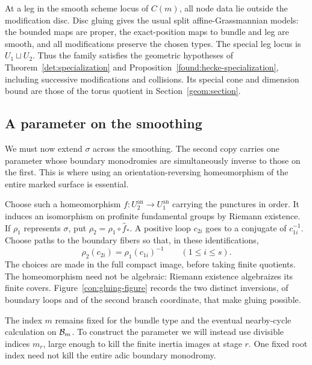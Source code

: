 At a leg in the smooth scheme locus of $C(m)$, all node data lie
outside the modification disc.  Disc gluing gives the usual split
affine-Grassmannian models: the bounded maps are proper, the
exact-position maps to bundle and leg are smooth, and all
modifications preserve the chosen types.  The special leg locus is
$U_1\sqcup U_2$.  Thus the family satisfies the geometric hypotheses
of Theorem~\ref{det:specialization} and
Proposition~\ref{found:hecke-specialization}, including successive
modifications and collisions.  Its special cone and dimension bound
are those of the torus quotient in Section~\ref{geom:section}.

\subsection{A parameter on the smoothing}

We must now extend $\sigma$ across the smoothing.  The second copy
carries one parameter whose boundary monodromies are simultaneously
inverse to those on the first.  This is where using an
orientation-reversing homeomorphism of the entire marked surface is
essential.

Choose such a homeomorphism
$f:U_2^{\mathrm{an}}\to U_1^{\mathrm{an}}$ carrying the punctures in
order.  It induces an isomorphism on profinite fundamental groups
by Riemann existence.  If $\rho_1$ represents $\sigma$, put
$\rho_2=\rho_1\circ\widehat f_*$.  A positive loop $c_{2i}$ goes to
a conjugate of $c_{1i}^{-1}$.  Choose paths to the boundary fibers
so that, in these identifications,
\begin{equation}\label{con:boundary-inversion}
              \rho_2(c_{2i})=\rho_1(c_{1i})^{-1}
              \qquad(1\leq i\leq s).
\end{equation}
The choices are made in the full compact image, before taking finite
quotients.  The homeomorphism need not be algebraic: Riemann
existence algebraizes its finite covers.  Figure~\ref{con:gluing-figure}
records the two distinct inversions, of boundary loops and of the
second branch coordinate, that make gluing possible.

The index $m$ remains fixed for the bundle type and the eventual
nearby-cycle calculation on $\mathcal B_m$.  To construct the parameter we
will instead use divisible indices $m_r$, large enough to kill the
finite inertia images at stage $r$.  One fixed root index need not
kill the entire adic boundary monodromy.

